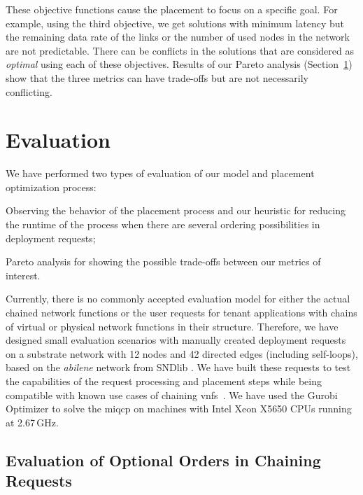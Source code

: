 \documentclass[10pt,a4paper,conference]{IEEEtran}
\begin{document}
These objective functions cause the placement to 
focus on a specific goal. For example, using the third objective, we get solutions
with minimum latency but the remaining data rate of the links or the number
of used nodes in the network are not predictable. There can be conflicts in the 
solutions that are considered as \emph{optimal} using each of these objectives. 
Results of our Pareto analysis (Section~\ref{sec:evaluation}) show that the three 
metrics can have trade-offs but are not necessarily conflicting.

\section{Evaluation}
\label{sec:evaluation}
We have performed two types of evaluation of our model and placement optimization process:
\begin{inparaenum}
 \item Observing the behavior of the placement process and our heuristic for 
 reducing the runtime of the process when there are several ordering 
 possibilities in deployment requests;
 \item Pareto analysis for showing the possible trade-offs between our metrics of
 interest.
\end{inparaenum}
Currently, there is no commonly accepted evaluation model
for either the actual chained network functions or the user requests for tenant
applications with chains of virtual or physical network functions in their structure.
Therefore, we have designed small evaluation scenarios with 
manually created deployment requests on a substrate network with 12 nodes
and 42 directed edges (including self-loops), based on the \emph{abilene} network
from SNDlib \cite{SNDlib10}. We have built these requests to test the capabilities
of the request processing and placement steps while being compatible with known
use cases of chaining \acp{vnf}~\cite{draft-liu-sfc-use-cases-05, leymannslides}. 
We have used the Gurobi Optimizer to solve the 
\ac{miqcp} on machines with Intel Xeon X5650 CPUs running at 2.67\,GHz. 

\subsection{Evaluation of Optional Orders in Chaining Requests}
\end{document}
